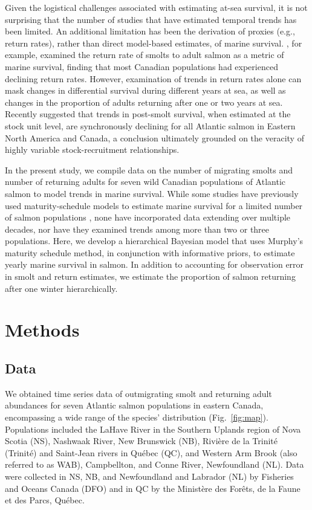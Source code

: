 \documentclass[12pt]{article}
\begin{document}
Given the logistical challenges associated with estimating at-sea survival, it
is not surprising that the number of studies that have estimated temporal
trends has been limited. An additional limitation has been the derivation of
proxies (e.g., return rates), rather than direct model-based estimates, of
marine survival.
\citet{Chaput2012a}, for example, examined the return rate of smolts to adult salmon 
as a metric of marine survival, finding that most Canadian populations 
had experienced declining return rates. 
However, examination of trends in return rates alone
can mask changes in differential survival during different years at sea, as well
as changes in the proportion of adults returning after one or two years at sea.
Recently \citet{Olmos2019} suggested that trends in post-smolt
survival, when estimated at the stock unit level, are synchronously declining
for all Atlantic salmon in Eastern North America and Canada, a conclusion ultimately 
grounded on the veracity of highly variable stock-recruitment relationships.

In the present study, we compile data on the number of migrating smolts and number of returning adults 
for seven wild Canadian populations of Atlantic salmon to model trends in marine survival.
While some studies have previously used maturity-schedule models to estimate marine
survival for a limited number of salmon populations \citep{Chaput2003b}, none
have incorporated data extending over multiple decades, nor have they examined
trends among more than two or three populations. 
Here, we develop a hierarchical Bayesian model that uses Murphy's maturity
schedule method, in conjunction with informative priors, to estimate yearly
marine survival in salmon. In addition to accounting for observation error in
smolt and return estimates, we estimate the proportion of salmon returning
after one winter hierarchically.

\section*{Methods}

\subsection*{Data}

We obtained time series data of outmigrating smolt and returning adult
abundances for seven Atlantic salmon populations in eastern Canada, encompassing a
wide range of the species' distribution (Fig.~\ref{fig:map}). 
Populations included the LaHave River in the Southern Uplands region of Nova
Scotia (NS), Nashwaak River, New Brunswick (NB), Rivi\`{e}re de la Trinit\'{e} (Trinit\'{e}) and
Saint-Jean rivers in Qu\'{e}bec (QC), and  Western Arm Brook (also referred to as  WAB), Campbellton, and
Conne River, Newfoundland (NL). 
Data were collected in NS, NB, and Newfoundland
and Labrador (NL) by Fisheries and Oceans Canada (DFO) and in QC
by the Minist\`{e}re des For\^{e}ts, de la Faune et des Parcs, Qu\'{e}bec.
\end{document}
